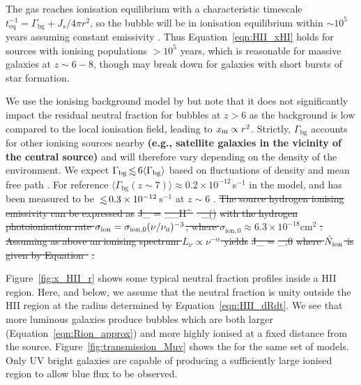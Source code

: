 \documentclass[fleqn,usenatbib]{mnras}
\providecommand{\DIFadd}[1]{{\protect\color{Green} {\bf #1}}} %
\providecommand{\DIFdel}[1]{{\protect\color{Gray} \scriptsize \sout{#1}}} %
\providecommand{\DIFaddbegin}{} %
\providecommand{\DIFaddend}{} %
\providecommand{\DIFdelbegin}{} %
\providecommand{\DIFdelend}{} %
\newcommand{\DIFscaledelfig}{0.5}
\newlength{\DIFdelgraphicswidth} %
\newlength{\DIFdelgraphicsheight} %
\newcommand{\DIFaddincludegraphics}[2][]{{\color{purple}\fbox{\DIFOincludegraphics[#1]{#2}}}} %
\newcommand{\DIFdelincludegraphics}[2][]{%
\sbox{\DIFdelgraphicsbox}{\DIFOincludegraphics[#1]{#2}}%
\settoboxwidth{\DIFdelgraphicswidth}{\DIFdelgraphicsbox} %
\settoboxtotalheight{\DIFdelgraphicsheight}{\DIFdelgraphicsbox} %
\scalebox{\DIFscaledelfig}{%
\parbox[b]{\DIFdelgraphicswidth}{\usebox{\DIFdelgraphicsbox}\\[-\baselineskip] \rule{\DIFdelgraphicswidth}{0em}}\llap{\resizebox{\DIFdelgraphicswidth}{\DIFdelgraphicsheight}{%
\setlength{\unitlength}{\DIFdelgraphicswidth}%
\begin{picture}(1,1)%
\thicklines\linethickness{2pt} %
{\color[rgb]{1,0,0}\put(0,0){\framebox(1,1){}}}%
{\color[rgb]{1,0,0}\put(0,0){\line( 1,1){1}}}%
{\color[rgb]{1,0,0}\put(0,1){\line(1,-1){1}}}%
\end{picture}%
}\hspace*{3pt}}} %
} %
\DeclareRobustCommand{\DIFaddbegin}{\DIFOaddbegin \let\includegraphics\DIFaddincludegraphics} %
\DeclareRobustCommand{\DIFaddend}{\DIFOaddend \let\includegraphics\DIFOincludegraphics} %
\DeclareRobustCommand{\DIFdelbegin}{\DIFOdelbegin \let\includegraphics\DIFdelincludegraphics} %
\DeclareRobustCommand{\DIFdelend}{\DIFOaddend \let\includegraphics\DIFOincludegraphics} %
\begin{document}
\DIFaddend The gas reaches ionisation equilibrium with a characteristic timescale $t_\mathrm{eq}^{-1} = \Gamma_\mathrm{bg} + J_s/4\pi r^2$, so the bubble will be in ionisation equilibrium within $\sim10^5$ years assuming constant emissivity \citep[e.g.,][]{Davies2019}. Thus Equation~\eqref{eqn:HII_xHI} holds for sources with ionising populations $>10^5$ years, which is reasonable for massive galaxies at $z\sim6-8$, though may break down for galaxies with short bursts of star formation.

We use the ionising background model by \citet{Khaire2019} but note that it does not significantly impact the residual neutral fraction for bubbles at $z>6$ as the background is low compared to the local ionisation field, leading to $\xHI\propto r^2$. Strictly, $\Gamma_\textrm{bg}$ accounts for other ionising sources nearby \DIFaddbegin \DIFadd{(e.g., satellite galaxies in the vicinity of the central source) }\DIFaddend and will therefore vary depending on the density of the environment. We expect $\Gamma_\textrm{bg} \simlt 6 \langle \Gamma_\textrm{bg} \rangle$ based on fluctuations of density and mean free path \citep{MesingerDijkstra2008,Davies2016}. For reference $\langle \Gamma_\textrm{bg}(z\sim7) \rangle \approx 0.2\times10^{-12}$\,s$^{-1}$ in the \citet{Khaire2019} model, and has been measured to be $\simlt 0.3\times10^{-12}$\,s$^{-1}$ at $z\sim6$ \citep{Wyithe2010,Calverley2011}.
\DIFdelbegin \DIFdel{The source hydrogen ionising emissivity can be expressed as
}%
\DIFdel{J_ = }%
\DIFdel{\int_{\nu_H}^\infty \,}%
\DIFdel{\nu \,  \sigma_(\nu)
}%
\DIFdel{with the hydrogen photoionisation rate $\sigma_\mathrm{ion} = \sigma_{\mathrm{ion},0} (\nu/\nu_\textsc{h})^{-3}$, where $\sigma_{\mathrm{ion},0} \approx 6.3\times10^{-18}\textrm{cm}^2$ }%
\DIFdel{. Assuming as above an ionising spectrum $L_\nu \propto \nu^{-\alpha}$ yields
}%
\DIFdel{J_ = }%
\DIFdel{ \sigma_{,0}
}%
\DIFdel{where $\Nion$ is given by Equation~}%
\DIFdel{.
}\DIFdelend 

Figure~\ref{fig:x_HII_r} shows some typical neutral fraction profiles inside a HII region. Here, and below, we assume that the neutral fraction is unity outside the HII region at the radius determined by Equation~\ref{eqn:HII_dRdt}. We see that more luminous galaxies produce bubbles which are both larger (Equation~\ref{eqn:Rion_approx}) and more highly ionised at a fixed distance from the source. Figure~\ref{fig:transmission_Muv} shows the \lya for the same set of models. Only UV bright galaxies are capable of producing a sufficiently large ionised region to allow blue flux to be observed.
\end{document}
